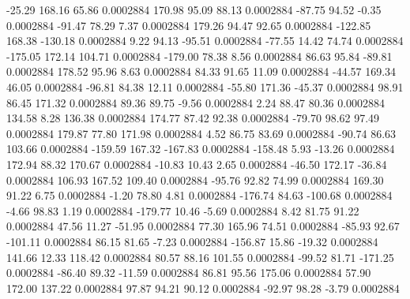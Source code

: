       -25.29      168.16       65.86     0.0002884
      170.98       95.09       88.13     0.0002884
      -87.75       94.52       -0.35     0.0002884
      -91.47       78.29        7.37     0.0002884
      179.26       94.47       92.65     0.0002884
     -122.85      168.38     -130.18     0.0002884
        9.22       94.13      -95.51     0.0002884
      -77.55       14.42       74.74     0.0002884
     -175.05      172.14      104.71     0.0002884
     -179.00       78.38        8.56     0.0002884
       86.63       95.84      -89.81     0.0002884
      178.52       95.96        8.63     0.0002884
       84.33       91.65       11.09     0.0002884
      -44.57      169.34       46.05     0.0002884
      -96.81       84.38       12.11     0.0002884
      -55.80      171.36      -45.37     0.0002884
       98.91       86.45      171.32     0.0002884
       89.36       89.75       -9.56     0.0002884
        2.24       88.47       80.36     0.0002884
      134.58        8.28      136.38     0.0002884
      174.77       87.42       92.38     0.0002884
      -79.70       98.62       97.49     0.0002884
      179.87       77.80      171.98     0.0002884
        4.52       86.75       83.69     0.0002884
      -90.74       86.63      103.66     0.0002884
     -159.59      167.32     -167.83     0.0002884
     -158.48        5.93      -13.26     0.0002884
      172.94       88.32      170.67     0.0002884
      -10.83       10.43        2.65     0.0002884
      -46.50      172.17      -36.84     0.0002884
      106.93      167.52      109.40     0.0002884
      -95.76       92.82       74.99     0.0002884
      169.30       91.22        6.75     0.0002884
       -1.20       78.80        4.81     0.0002884
     -176.74       84.63     -100.68     0.0002884
       -4.66       98.83        1.19     0.0002884
     -179.77       10.46       -5.69     0.0002884
        8.42       81.75       91.22     0.0002884
       47.56       11.27      -51.95     0.0002884
       77.30      165.96       74.51     0.0002884
      -85.93       92.67     -101.11     0.0002884
       86.15       81.65       -7.23     0.0002884
     -156.87       15.86      -19.32     0.0002884
      141.66       12.33      118.42     0.0002884
       80.57       88.16      101.55     0.0002884
      -99.52       81.71     -171.25     0.0002884
      -86.40       89.32      -11.59     0.0002884
       86.81       95.56      175.06     0.0002884
       57.90      172.00      137.22     0.0002884
       97.87       94.21       90.12     0.0002884
      -92.97       98.28       -3.79     0.0002884
